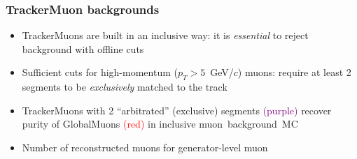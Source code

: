 \documentclass[compress]{beamer}
\begin{document}
\begin{frame}
\frametitle{TrackerMuon backgrounds}
\begin{itemize}
\item TrackerMuons are built in an inclusive way: it is {\it essential} to reject background with offline cuts
\item Sufficient cuts for high-momentum ($p_T > 5$~GeV/$c$) muons: require at least 2 segments to be {\it exclusively} matched to the track
\item TrackerMuons with 2 ``arbitrated'' (exclusive) segments \textcolor{purple}{(purple)} recover purity of GlobalMuons \textcolor{red}{(red)} in inclusive \mbox{muon background MC\hspace{-1 cm}}
\item<2-6> Number of reconstructed muons for  generator-level muon\only<2>{s}\only<4>{s}\only<5>{s}
\end{itemize}


\end{frame}
\end{document}
